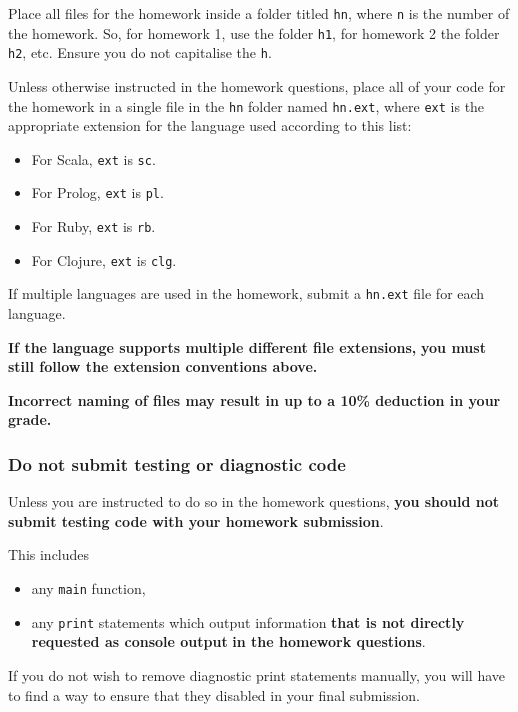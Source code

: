 \documentclass[11pt]{article}
\begin{document}
Place all files for the homework
inside a folder titled \texttt{hn}, where \texttt{n} is the number of the homework.
So, for homework 1, use the folder \texttt{h1}, for homework 2 the folder \texttt{h2}, etc.
Ensure you do not capitalise the \texttt{h}.

Unless otherwise instructed in the homework questions,
place all of your code for the homework
in a single file in the \texttt{hn} folder named \texttt{hn.ext},
where \texttt{ext} is the appropriate extension for the language used
according to this list:
\begin{itemize}
\item For Scala, \texttt{ext} is \texttt{sc}.
\item For Prolog, \texttt{ext} is \texttt{pl}.
\item For Ruby, \texttt{ext} is \texttt{rb}.
\item For Clojure, \texttt{ext} is \texttt{clg}.
\end{itemize}
If multiple languages are used in the homework,
submit a \texttt{hn.ext} file for each language.

\begin{center}
\textbf{If the language supports multiple different file extensions,}
\textbf{you must still follow the extension conventions above.}
\end{center}

\begin{center}
\textbf{Incorrect naming of files may result in up to a 10\% deduction in your grade.}
\end{center}

\subsubsection*{Do not submit testing or diagnostic code}
\label{sec:org3efa1fc}

Unless you are instructed to do so in the homework questions,
\textbf{you should not submit testing code with your homework submission}.

This includes
\begin{itemize}
\item any \texttt{main} function,
\item any \texttt{print} statements which output information
\textbf{that is not directly requested as console output}
\textbf{in the homework questions}.
\end{itemize}

If you do not wish to remove diagnostic print statements manually,
you will have to find a way to ensure that they disabled
in your final submission.
\end{document}
